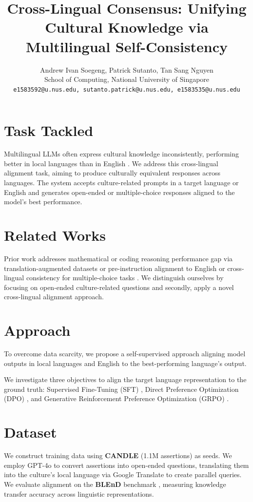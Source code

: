 \documentclass[11pt]{article}
\title{Cross-Lingual Consensus: Unifying Cultural Knowledge via Multilingual Self-Consistency}
\author{Andrew Ivan Soegeng, Patrick Sutanto, Tan Sang Nguyen\\
        School of Computing, National University of Singapore \\
        \texttt{e1583592@u.nus.edu, sutanto.patrick@u.nus.edu, e1583535@u.nus.edu}}
\begin{document}
\maketitle

\section{Task Tackled}
Multilingual LLMs often express cultural knowledge inconsistently, performing better in local languages than in English \citep{10.1093/pnasnexus/pgae346, zhang-etal-2025-cross}. We address this cross-lingual alignment task, aiming to produce culturally equivalent responses across languages. The system accepts culture-related prompts in a target language or English and generates open-ended or multiple-choice responses aligned to the model's best performance.

\section{Related Works}
Prior work addresses mathematical or coding reasoning performance gap via translation-augmented datasets \citep{chen-etal-2024-breaking} or pre-instruction alignment \citep{zhu-etal-2024-question} to English or cross-lingual consistency for multiple-choice tasks \citep{wang-etal-2025-calm}. We distinguish ourselves by focusing on open-ended culture-related questions and secondly, apply a novel cross-lingual alignment approach.

\section{Approach}
To overcome data scarcity, we propose a self-supervised approach aligning model outputs in local languages and English to the best-performing language's output. 

We investigate three objectives to align the target language representation to the ground truth: Supervised Fine-Tuning (SFT) \citep{ouyang2022training}, Direct Preference Optimization (DPO) \citep{rafailov2023direct}, and Generative Reinforcement Preference Optimization (GRPO) \citep{shao2024deepseekmath}.

\section{Dataset}
We construct training data using \textbf{CANDLE} \citep{nguyen2023extracting} (1.1M assertions) as seeds. We employ GPT-4o to convert assertions into open-ended questions, translating them into the culture's local language via Google Translate to create parallel queries. We evaluate alignment on the \textbf{BLEnD} benchmark \citep{myung2024blend}, measuring knowledge transfer accuracy across linguistic representations.
\end{document}
